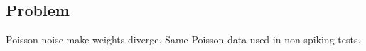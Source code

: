 	\subsection{Problem}
Poisson noise make weights diverge.
Same Poisson data used in non-spiking tests.
	
